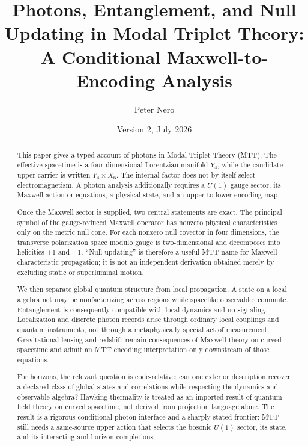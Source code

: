 \documentclass[11pt,a4paper]{article}
\title{\textbf{Photons, Entanglement, and Null Updating in Modal Triplet Theory:}\\
\large A Conditional Maxwell-to-Encoding Analysis}
\author{Peter Nero}
\date{Version 2, July 2026}
\numberwithin{equation}{section}
\theoremstyle{definition}
\theoremstyle{remark}
\begin{document}
\maketitle

\begin{abstract}
This paper gives a typed account of photons in Modal Triplet Theory
(MTT).  The effective spacetime is a four-dimensional Lorentzian manifold
\(Y_4\), while the candidate upper carrier is written \(Y_4\times X_6\).
The internal factor does not by itself select electromagnetism.  A photon
analysis additionally requires a \(U(1)\) gauge sector, its Maxwell action
or equations, a physical state, and an upper-to-lower encoding map.

Once the Maxwell sector is supplied, two central statements are exact.
The principal symbol of the gauge-reduced Maxwell operator has nonzero
physical characteristics only on the metric null cone.  For each nonzero
null covector in four dimensions, the transverse polarization space
modulo gauge is two-dimensional and decomposes into helicities \(+1\) and
\(-1\).  ``Null updating'' is therefore a useful MTT name for Maxwell
characteristic propagation; it is not an independent derivation obtained
merely by excluding static or superluminal motion.

We then separate global quantum structure from local propagation.  A
state on a local algebra net may be nonfactorizing across regions while
spacelike observables commute.  Entanglement is consequently compatible
with local dynamics and no signaling.  Localization and discrete photon
records arise through ordinary local couplings and quantum instruments,
not through a metaphysically special act of measurement.  Gravitational
lensing and redshift remain consequences of Maxwell theory on curved
spacetime and admit an MTT encoding interpretation only downstream of
those equations.

For horizons, the relevant question is code-relative: can one exterior
description recover a declared class of global states and correlations
while respecting the dynamics and observable algebra?  Hawking thermality
is treated as an imported result
of quantum field theory on curved spacetime, not derived from projection
language alone.  The result is a rigorous conditional photon interface
and a sharply stated frontier: MTT still needs a same-source upper action
that selects the bosonic \(U(1)\) sector, its state, and its interacting
and horizon completions.
\end{abstract}
\end{document}
